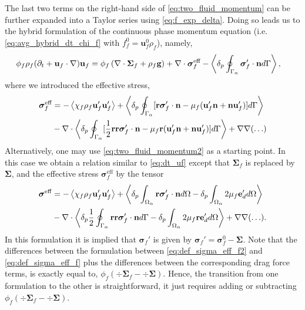 The last two terms on the right-hand side of \ref{eq:two_fluid_momentum} can be further expanded into a Taylor series using \ref{eq:f_exp_delta}. 
Doing so leads us to the hybrid formulation of the continuous phase momentum  equation (i.e. \ref{eq:avg_hybrid_dt_chi_f} with $f_f^0 = \textbf{u}_f^0\rho_f$), namely,
\begin{align}
    \phi_f \rho_f(\pddt + \textbf{u}_f  \cdot \grad) \textbf{u}_f
    &= \phi_f 
    \left(\div \bm{\Sigma}_f
    + \rho_f \textbf{g}\right)
    + \div \bm\sigma_f^\text{eff}
    - \pSavg{\bm\sigma_f'\cdot \textbf{n}}, 
    \label{eq:dt_uf}
\end{align}
where we introduced the effective stress, 
\begin{align}
    \bm{\sigma}^{\text{eff}}_f 
    &= 
    - \avg{\chi_f\rho_f \textbf{u}_f'\textbf{u}_f'} 
    + \pSavg{[\textbf{r}\bm\sigma'_f\cdot \textbf{n} - \mu_f (\textbf{u}_f' \textbf{n} + \textbf{n} \textbf{u}_f')]}\nonumber\\
    &- \div
        \pSavg{[\frac{1}{2}\textbf{rr}\bm\sigma'_f\cdot \textbf{n}- \mu_f\textbf{r} (\textbf{u}_f' \textbf{n} + \textbf{n} \textbf{u}_f')]}
        + \grad\grad (\ldots)
    \label{eq:def_sigma_eff_f}
\end{align}
Alternatively, one may use \ref{eq:two_fluid_momentum2} as a starting point.
In this case we obtain a relation similar to \ref{eq:dt_uf} except that $\bm\Sigma_f$ is replaced by $\bm\Sigma$, and the effective stress $\bm\sigma_f^\text{eff}$ by the tensor
\begin{align}
    \bm{\sigma}^{\text{eff}} 
    &= 
    - \avg{\chi_f\rho_f \textbf{u}_f'\textbf{u}_f'} 
    + \pavg{\intO{\textbf{r}\bm\sigma'_f\cdot \textbf{n}} - \delta_p\intO{2\mu_f\textbf{e}_d'}}\nonumber\\
    &- \div
        \pavg{ \frac{1}{2}\intS{\textbf{rr}\bm\sigma'_f\cdot \textbf{n}}
        - \delta_p\intO{2\mu_f \textbf{r} \textbf{e}_d'}}
        + \grad\grad (\ldots). 
    \label{eq:def_sigma_eff_f2}
\end{align}
In this formulation it is implied that $\bm\sigma_f'$ is given by $\bm\sigma_f' = \bm\sigma_f^0 -\bm\Sigma$. 
Note that the differences between the formulation between \ref{eq:def_sigma_eff_f2} and \ref{eq:def_sigma_eff_f} plus the differences between the corresponding drag force terms, is exactly equal to, $\phi_f (\div \bm\Sigma_f - \div\bm\Sigma)$.
Hence, the transition from one formulation to the other is straightforward, it just requires adding or subtracting $\phi_f (\div \bm\Sigma_f - \div\bm\Sigma)$. 


